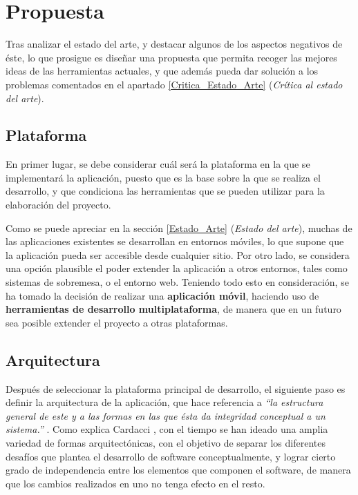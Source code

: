 

\section{Propuesta} \label{Propuesta}
Tras analizar el estado del arte, y destacar algunos de los aspectos negativos de éste, lo que prosigue es diseñar una 
propuesta que permita recoger las mejores ideas de las herramientas actuales, y que además pueda dar solución a los 
problemas comentados en el apartado \ref{Critica_Estado_Arte} (\textit{Crítica al estado del arte}). \medskip

\subsection{Plataforma} \label{Plataforma}
En primer lugar, se debe considerar cuál será la plataforma en la que se implementará la aplicación, puesto que es la base 
sobre la que se realiza el desarrollo, y que condiciona las herramientas que se pueden utilizar para la elaboración del proyecto. 
\medskip

Como se puede apreciar en la sección \ref{Estado_Arte} (\textit{Estado del arte}), muchas de las aplicaciones existentes 
se desarrollan en entornos móviles, lo que supone que la aplicación pueda ser accesible desde cualquier sitio. Por otro lado, 
se considera una opción plausible el poder extender la aplicación a otros entornos, tales como sistemas de sobremesa, o el entorno 
web. Teniendo todo esto en consideración, se ha tomado la decisión de realizar una \textbf{aplicación móvil}, haciendo uso de 
\textbf{herramientas de desarrollo multiplataforma}, de manera que en un futuro sea posible extender el proyecto a otras plataformas.

\subsection{Arquitectura} \label{Arquitectura}
Después de seleccionar la plataforma principal de desarrollo, el siguiente paso es definir la arquitectura de la aplicación, 
que hace referencia a \textit{“la estructura general de este y a las formas en las que ésta da integridad conceptual a un 
sistema.”} \autocite*{Shaw1995}. Como explica Cardacci \autocite*{Addati2013}, con el tiempo se han ideado una amplia 
variedad de formas arquitectónicas, con el objetivo de separar los diferentes desafíos que plantea el desarrollo de software 
conceptualmente, y lograr cierto grado de independencia entre los elementos que componen el software, de manera que los cambios 
realizados en uno no tenga efecto en el resto. \medskip

